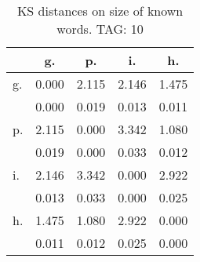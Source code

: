 \begin{table}[h!]
\begin{center}
\begin{tabular}{| l | c | c | c | c |}\hline
 & g. & p. & i. & h. \\\hline
g. & 0.000  & 2.115  & 2.146  & 1.475 \\\hline
 & 0.000  & 0.019  & 0.013  & 0.011 \\\hline
p. & 2.115  & 0.000  & 3.342  & 1.080 \\\hline
 & 0.019  & 0.000  & 0.033  & 0.012 \\\hline
i. & 2.146  & 3.342  & 0.000  & 2.922 \\\hline
 & 0.013  & 0.033  & 0.000  & 0.025 \\\hline
h. & 1.475  & 1.080  & 2.922  & 0.000 \\\hline
 & 0.011  & 0.012  & 0.025  & 0.000 \\\hline
\end{tabular}
\caption{KS distances on size of known words. TAG: 10}
\end{center}
\end{table}